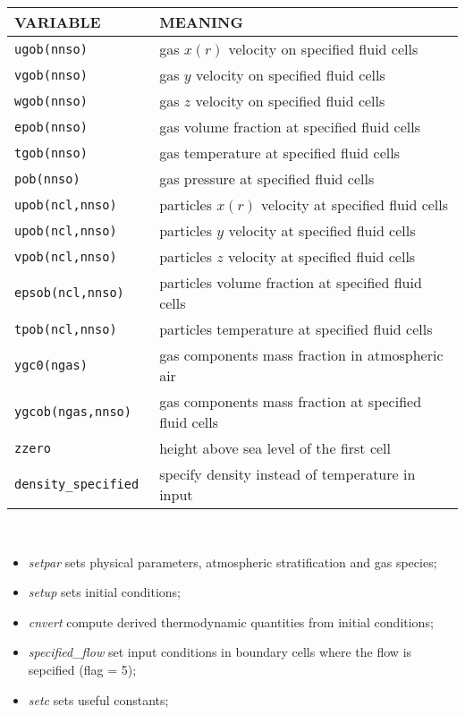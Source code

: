 \begin{tabular}{|p{6cm}|p{6cm}|}\hline
VARIABLE & MEANING\\\hline
\tt ugob(nnso) & gas $x(r)$ velocity on specified fluid cells\\\hline 
\tt vgob(nnso) & gas $y$ velocity on specified fluid cells\\\hline
\tt wgob(nnso) & gas $z$ velocity on specified fluid cells\\\hline
\tt epob(nnso) & gas volume fraction at specified fluid cells\\\hline
\tt  tgob(nnso) & gas temperature at specified fluid cells\\\hline
\tt pob(nnso) & gas pressure at specified fluid cells\\\hline
\tt upob(ncl,nnso) & particles $x(r)$ velocity at specified fluid cells\\\hline
\tt upob(ncl,nnso) & particles $y$ velocity at specified fluid cells\\\hline
\tt vpob(ncl,nnso) & particles $z$ velocity at specified fluid cells\\\hline
\tt epsob(ncl,nnso) & particles volume fraction at specified fluid cells\\\hline
\tt tpob(ncl,nnso) & particles temperature at specified fluid cells\\\hline
\tt ygc0(ngas) & gas components mass fraction in atmospheric air\\\hline
\tt ygcob(ngas,nnso) & gas components mass fraction at specified fluid cells\\\hline
\tt zzero & height above sea level of the first cell\\\hline
\tt density\_specified & specify density instead of temperature in input\\\hline
\end{tabular}\\
\begin{itemize}
\item {\em setpar} sets physical parameters, atmospheric stratification and gas species;
\item {\em setup} sets initial conditions;
\item {\em cnvert} compute derived thermodynamic quantities from initial conditions;
\item {\em specified\_flow} set input conditions in  boundary cells where the flow is sepcified (flag = 5);
\item {\em setc} sets useful constants;
\end{itemize}
